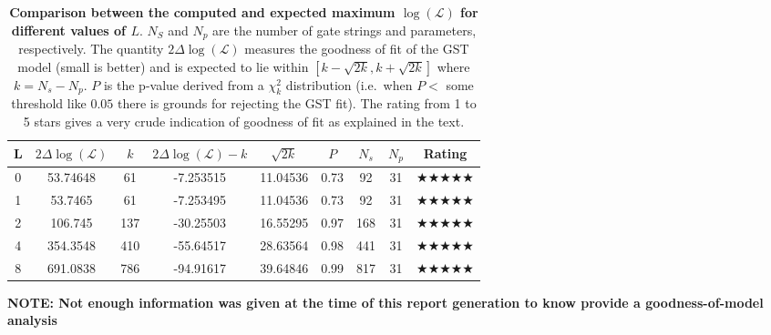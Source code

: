 \documentclass{article}[11pt]
\begin{document}
{\begin{table}[h]
\begin{center}
\begin{tabular}[l]{|c|c|c|c|c|c|c|c|c|}
\hline
L & $2\Delta\log(\mathcal{L})$ & $k$ & $2\Delta\log(\mathcal{L})-k$ & $\sqrt{2k}$ & $P$ & $N_s$ & $N_p$ & Rating \\ \hline
0 & 53.74648 & 61 & -7.253515 & 11.04536 & 0.73 & 92 & 31 & $\bigstar\bigstar\bigstar\bigstar\bigstar$ \\ \hline
1 & 53.7465 & 61 & -7.253495 & 11.04536 & 0.73 & 92 & 31 & $\bigstar\bigstar\bigstar\bigstar\bigstar$ \\ \hline
2 & 106.745 & 137 & -30.25503 & 16.55295 & 0.97 & 168 & 31 & $\bigstar\bigstar\bigstar\bigstar\bigstar$ \\ \hline
4 & 354.3548 & 410 & -55.64517 & 28.63564 & 0.98 & 441 & 31 & $\bigstar\bigstar\bigstar\bigstar\bigstar$ \\ \hline
8 & 691.0838 & 786 & -94.91617 & 39.64846 & 0.99 & 817 & 31 & $\bigstar\bigstar\bigstar\bigstar\bigstar$ \\ \hline
\end{tabular}

\caption{\textbf{Comparison between the computed and expected maximum $\log(\mathcal{L})$ for different values of $L$}.  $N_S$ and $N_p$ are the number of gate strings and parameters, respectively.  The quantity $2\Delta\log(\mathcal{L})$ measures the goodness of fit of the GST model (small is better) and is expected to lie within $[k-\sqrt{2k},k+\sqrt{2k}]$ where $k = N_s-N_p$. $P$ is the p-value derived from a $\chi^2_k$ distribution (i.e.~when $P <$ some threshold like $0.05$ there is grounds for rejecting the GST fit). The rating from 1 to 5 stars gives a very crude indication of goodness of fit as explained in the text.\label{logLProgressTable}}
\end{center}
\end{table}

}{
\textbf{NOTE: Not enough information was given at the time of this report generation to know provide a goodness-of-model analysis}
}

\FloatBarrier
\end{document}
